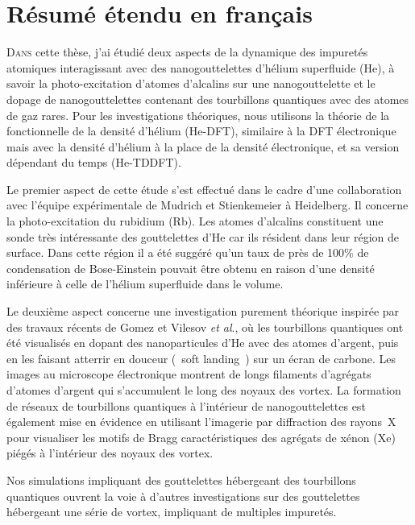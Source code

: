 \fancyhead[LE,RO]{\color{black}{\thepage}}
\fancyfoot[C]{}
\setcounter{figure}{0}
\setcounter{equation}{0}
\chapter{Résumé étendu en français}
	\lettrine[lines=4]{\color{activeColor}D}{ans} cette thèse, j'ai étudié deux aspects de la dynamique des impuretés atomiques interagissant avec des nanogouttelettes d'hélium superfluide (He), à savoir la photo-excitation d'atomes d'alcalins sur une nanogouttelette et le dopage de nanogouttelettes contenant des tourbillons quantiques avec des atomes de gaz rares. Pour les investigations théoriques, nous utilisons la théorie de la fonctionnelle de la densité d'hélium (He-DFT), similaire à la DFT électronique mais avec la densité d'hélium à la place de la densité électronique,  et sa version dépendant du temps (He-TDDFT).	

	Le premier aspect de cette étude s'est effectué dans le cadre d'une collaboration avec l'équipe expérimentale de Mudrich et Stienkemeier à Heidelberg.
	Il concerne la photo-excitation du rubidium (Rb). 
	Les atomes d'alcalins constituent une sonde très intéressante des gouttelettes d'He car ils résident dans leur région de surface.
	Dans cette région il a été suggéré qu'un taux de près de 100\% de condensation de Bose-Einstein pouvait être obtenu en raison d'une densité inférieure à celle de l'hélium superfluide  dans le volume.
	
	Le deuxième aspect concerne une investigation purement théorique inspirée par des travaux récents de Gomez et Vilesov \emph{et al}., où les tourbillons quantiques ont été visualisés en dopant des nanoparticules d'He avec des atomes d'argent, puis en les faisant atterrir en douceur (\guillemotleft~soft landing~\guillemotright{}) sur un écran de carbone. 
	Les images au microscope électronique montrent de longs filaments d'agrégats d'atomes d'argent qui s'accumulent le long des noyaux des vortex. La formation de réseaux de tourbillons quantiques à l'intérieur de nanogouttelettes est également mise en évidence en utilisant l'imagerie par diffraction des rayons~X pour visualiser les motifs de Bragg caractéristiques des agrégats de xénon (Xe) piégés à l'intérieur des noyaux des vortex.
	
	Nos simulations impliquant des gouttelettes hébergeant des tourbillons quantiques ouvrent la voie à d'autres investigations sur des gouttelettes hébergeant une série de vortex, impliquant de multiples impuretés.
		
